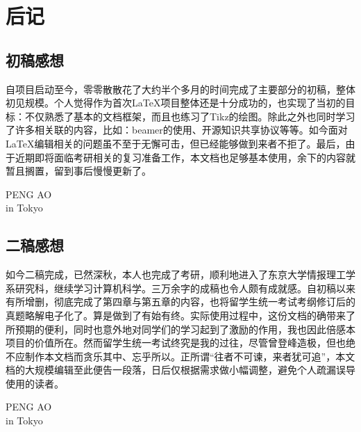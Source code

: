 
\chapter{后记}

\section*{初稿感想}
自项目启动至今，零零散散花了大约半个多月的时间完成了主要部分的初稿，整体初见规模。个人觉得作为首次\LaTeX 项目整体还是十分成功的，也实现了当初的目标：不仅熟悉了基本的文档框架，而且也练习了Tikz的绘图。除此之外也同时学习了许多相关联的内容，比如：beamer的使用、开源知识共享协议等等。如今面对\LaTeX 编辑相关的问题虽不至于无懈可击，但已经能够做到来者不拒了。最后，由于近期即将面临考研相关的复习准备工作，本文档也足够基本使用，余下的内容就暂且搁置，留到事后慢慢更新了。

\begin{flushright}
    PENG AO\\
     in Tokyo
\end{flushright}

\section*{二稿感想}

如今二稿完成，已然深秋，本人也完成了考研，顺利地进入了东京大学情报理工学系研究科，继续学习计算机科学。三万余字的成稿也令人颇有成就感。自初稿以来有所增删，彻底完成了第四章与第五章的内容，也将留学生统一考试考纲修订后的真题略解电子化了。算是做到了有始有终。实际使用过程中，这份文档的确带来了所预期的便利，同时也意外地对同学们的学习起到了激励的作用，我也因此倍感本项目的价值所在。然而留学生统一考试终究是我的过往，尽管曾登峰造极，但也绝不应制作本文档而贪乐其中、忘乎所以。正所谓“往者不可谏，来者犹可追”，本文档的大规模编辑至此便告一段落，日后仅根据需求做小幅调整，避免个人疏漏误导使用的读者。

\begin{flushright}
    PENG AO\\
     in Tokyo
\end{flushright}
